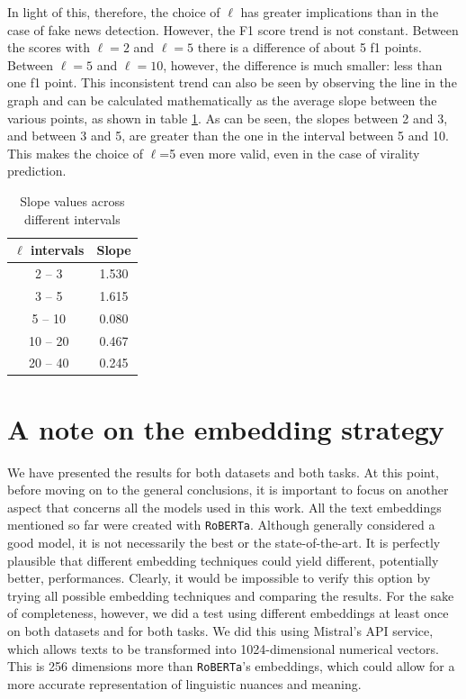 \documentclass[a4paper,twoside,12pt]{book}
\begin{document}
In light of this, therefore, the choice of $\ell$ has greater implications than in the case of fake news detection. However, the F1 score trend is not constant. Between the scores with $\ell=2$ and $\ell=5$ there is a difference of about 5 f1 points. Between $\ell=5$ and $\ell=10$, however, the difference is much smaller: less than one f1 point. This inconsistent trend can also be seen by observing the line in the graph and can be calculated mathematically as the average slope between the various points, as shown in table \ref{tab:slope_intervals}. As can be seen, the slopes between 2 and 3, and between 3 and 5, are greater than the one in the interval between 5 and 10. This makes the choice of $\ell$=5 even more valid, even in the case of virality prediction.

\begin{table}[h!]
	\centering
	\begin{tabular}{c|c}
		\hline
		\textbf{$\ell$ intervals} & \textbf{Slope} \\
		\hline
		2 -- 3   & 1.530 \\
		3 -- 5   & 1.615 \\
		5 -- 10  & 0.080 \\
		10 -- 20 & 0.467 \\
		20 -- 40 & 0.245 \\
		\hline
	\end{tabular}
	\caption{Slope values across different intervals}
	\label{tab:slope_intervals}
\end{table}

\clearpage

\section{A note on the embedding strategy}
We have presented the results for both datasets and both tasks. At this point, before moving on to the general conclusions, it is important to focus on another aspect that concerns all the models used in this work. All the text embeddings mentioned so far were created with \texttt{RoBERTa}. Although generally considered a good model, it is not necessarily the best or the state-of-the-art. It is perfectly plausible that different embedding techniques could yield different, potentially better, performances. Clearly, it would be impossible to verify this option by trying all possible embedding techniques and comparing the results. For the sake of completeness, however, we did a test using different embeddings at least once on both datasets and for both tasks. We did this using Mistral's API service, which allows texts to be transformed into 1024-dimensional numerical vectors. This is 256 dimensions more than \texttt{RoBERTa}'s embeddings, which could allow for a more accurate representation of linguistic nuances and meaning.\\
\end{document}
